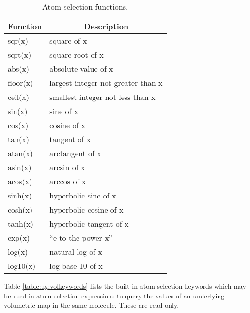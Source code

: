 \begin{table}[htb]
\hspace{1.5in}
\begin{tabular}{|l|l|} \hline
\multicolumn{1}{|c}{Function} & 
\multicolumn{1}{|c|}{Description} \\ \hline\hline
    sqr(x)      & square of x \\
    sqrt(x)     & square root of x \\
    abs(x)      & absolute value of x \\
    floor(x)    & largest integer not greater than x \\
    ceil(x)     & smallest integer not less than x \\
    sin(x)      & sine of x \\
    cos(x)      & cosine of x \\
    tan(x)      & tangent of x \\
    atan(x)     & arctangent of x \\
    asin(x)     & arcsin of x \\
    acos(x)     & arccos of x \\
    sinh(x)     & hyperbolic sine of x \\
    cosh(x)     & hyperbolic cosine of x \\
    tanh(x)     & hyperbolic tangent of x \\
    exp(x)      & ``e to the power x'' \\
    log(x)      & natural log of x \\
    log10(x)    & log base 10 of x \\ \hline
\end{tabular}
\caption{Atom selection functions.}
\label{table:ug:functions}
\end{table}


Table \ref{table:ug:volkeywords} lists the built-in atom selection 
keywords which may be used in atom selection expressions to query the 
values of an underlying volumetric map in the same molecule. 
These are read-only.

